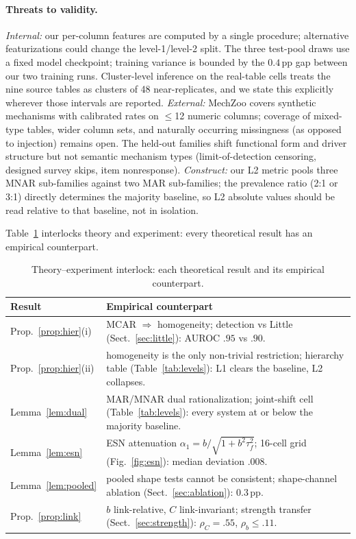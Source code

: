 \documentclass[conference]{IEEEtran}
\begin{document}
\paragraph{Threats to validity.}
\emph{Internal:} our per-column features are computed by a single procedure; alternative
featurizations could change the level-1/level-2 split. The three test-pool draws use a
fixed model checkpoint; training variance is bounded by the $0.4$\,pp gap between
our two training runs. Cluster-level
inference on the real-table cells treats the nine source tables as clusters of 48
near-replicates, and we state this explicitly wherever those intervals are reported. \emph{External:} MechZoo
covers synthetic mechanisms with calibrated rates on $\le$12 numeric columns; coverage of
mixed-type tables, wider column sets, and naturally occurring missingness (as opposed to
injection) remains open. The held-out families shift functional form and driver structure
but not semantic mechanism types (limit-of-detection censoring, designed survey skips,
item nonresponse). \emph{Construct:} our L2 metric pools three MNAR sub-families against
two MAR sub-families; the prevalence ratio (2:1 or 3:1) directly determines the majority
baseline, so L2 absolute values should be read relative to that baseline, not in
isolation.

Table~\ref{tab:theory-exp} interlocks theory and experiment: every theoretical result has an
empirical counterpart.

\begin{table}[t]
\caption{Theory--experiment interlock: each theoretical result and its empirical counterpart.}
\label{tab:theory-exp}
\centering\small
\begin{tabular}{@{}p{0.62in}p{2.63in}@{}}
\toprule
Result & Empirical counterpart \\
\midrule
Prop.~\ref{prop:hier}(i) & MCAR $\Rightarrow$ homogeneity; detection vs Little (Sect.~\ref{sec:little}): AUROC $.95$ vs $.90$. \\
Prop.~\ref{prop:hier}(ii) & homogeneity is the only non-trivial restriction; hierarchy table (Table~\ref{tab:levels}): L1 clears the baseline, L2 collapses. \\
Lemma~\ref{lem:dual} & MAR/MNAR dual rationalization; joint-shift cell (Table~\ref{tab:levels}): every system at or below the majority baseline. \\
Lemma~\ref{lem:esn} & ESN attenuation $\alpha_1=b/\sqrt{1+b^2\tau_f^2}$; 16-cell grid (Fig.~\ref{fig:esn}): median deviation $.008$. \\
Lemma~\ref{lem:pooled} & pooled shape tests cannot be consistent; shape-channel ablation (Sect.~\ref{sec:ablation}): $0.3$\,pp. \\
Prop.~\ref{prop:link} & $b$ link-relative, $C$ link-invariant; strength transfer (Sect.~\ref{sec:strength}): $\rho_C{=}.55$, $\rho_b{\le}.11$. \\
\bottomrule
\end{tabular}
\end{table}
\end{document}
